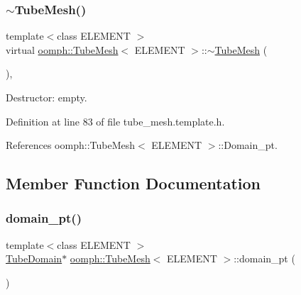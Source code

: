 \mbox{\label{classoomph_1_1TubeMesh_af77e5d5022c77c3bf7340387258b2d51}} 
\subsubsection{\texorpdfstring{$\sim$\+Tube\+Mesh()}{~TubeMesh()}}
{\footnotesize\ttfamily template$<$class E\+L\+E\+M\+E\+NT $>$ \\
virtual \hyperlink{classoomph_1_1TubeMesh}{oomph\+::\+Tube\+Mesh}$<$ E\+L\+E\+M\+E\+NT $>$\+::$\sim$\hyperlink{classoomph_1_1TubeMesh}{Tube\+Mesh} (\begin{DoxyParamCaption}{ }\end{DoxyParamCaption})\hspace{0.3cm}{\ttfamily [inline]}, {\ttfamily [virtual]}}



Destructor\+: empty. 



Definition at line 83 of file tube\+\_\+mesh.\+template.\+h.



References oomph\+::\+Tube\+Mesh$<$ E\+L\+E\+M\+E\+N\+T $>$\+::\+Domain\+\_\+pt.



\subsection{Member Function Documentation}
\mbox{\label{classoomph_1_1TubeMesh_a96715b52dbbccaaf89d722a05e57e28a}} 
\subsubsection{\texorpdfstring{domain\+\_\+pt()}{domain\_pt()}\hspace{0.1cm}{\footnotesize\ttfamily [1/2]}}
{\footnotesize\ttfamily template$<$class E\+L\+E\+M\+E\+NT $>$ \\
\hyperlink{classoomph_1_1TubeDomain}{Tube\+Domain}$\ast$ \hyperlink{classoomph_1_1TubeMesh}{oomph\+::\+Tube\+Mesh}$<$ E\+L\+E\+M\+E\+NT $>$\+::domain\+\_\+pt (\begin{DoxyParamCaption}{ }\end{DoxyParamCaption})\hspace{0.3cm}{\ttfamily [inline]}}



